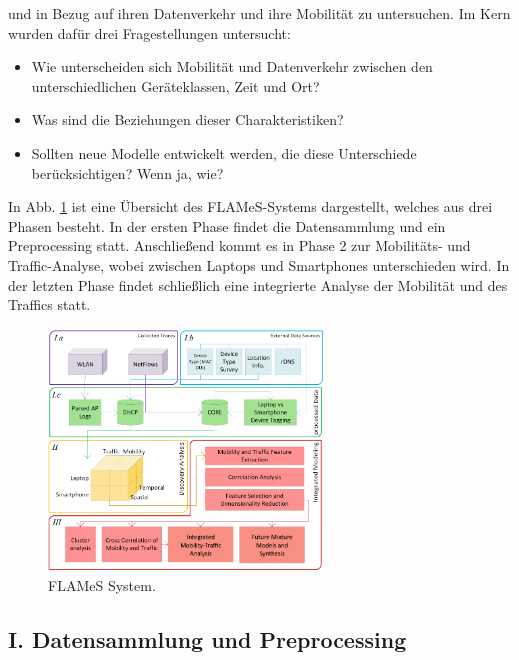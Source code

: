 \documentclass[12pt, a4paper]{article}
\begin{document}
und in Bezug auf ihren Datenverkehr und ihre Mobilität zu untersuchen.
\newline\newline
Im Kern wurden dafür drei Fragestellungen untersucht:\newline
\begin{itemize}
    \item Wie unterscheiden sich Mobilität und Datenverkehr zwischen den unterschiedlichen Geräteklassen, Zeit und Ort?
    \item Was sind die Beziehungen dieser Charakteristiken?
    \item Sollten neue Modelle entwickelt werden, die diese Unterschiede berücksichtigen? Wenn ja, wie?
\end{itemize}
\pagebreak
In Abb. \ref{fig:flames} ist eine Übersicht des FLAMeS-Systems dargestellt, welches aus drei Phasen besteht.
In der ersten Phase findet die Datensammlung und ein Preprocessing statt. Anschließend kommt es in Phase 2
zur Mobilitäts- und Traffic-Analyse, wobei zwischen Laptops und Smartphones unterschieden wird. In der letzten
Phase findet schließlich eine integrierte Analyse der Mobilität und des Traffics statt.

\begin{figure}[H]
\centering
\includegraphics[width=0.65\textwidth]{img/FLAMeS.png}
\caption{FLAMeS System. \cite{Alipour2018}}
\label{fig:flames}
\end{figure}

\subsection{I. Datensammlung und Preprocessing}
\end{document}

